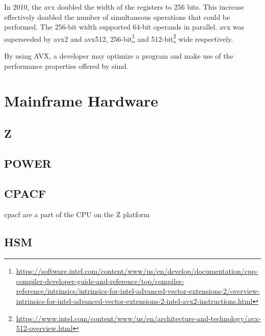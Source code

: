 In 2010, the \gls{avx} doubled the width of the registers to 256 bits. This increase effectively doubled the number of simultaneous operations that could be performed. The 256-bit width supported 64-bit operands in parallel\cite{hennessy2011:avx}. \gls{avx} was superseeded by \gls{avx2} and \gls{avx512}, 256-bit\footnote{\href{https://software.intel.com/content/www/us/en/develop/documentation/cpp-compiler-developer-guide-and-reference/top/compiler-reference/intrinsics/intrinsics-for-intel-advanced-vector-extensions-2/overview-intrinsics-for-intel-advanced-vector-extensions-2-intel-avx2-instructions.html}{https://software.intel.com/content/www/us/en/develop/documentation/cpp-compiler-developer-guide-and-reference/top/compiler-reference/intrinsics/intrinsics-for-intel-advanced-vector-extensions-2/overview-intrinsics-for-intel-advanced-vector-extensions-2-intel-avx2-instructions.html}} and 512-bit\footnote{\href{https://www.intel.com/content/www/us/en/architecture-and-technology/avx-512-overview.html}{https://www.intel.com/content/www/us/en/architecture-and-technology/avx-512-overview.html}} wide respectively.

By using AVX, a developer may optimize a program and make use of the performance properties offered by \gls{simd}\cite{hennessy2011:avx}.

\section{Mainframe Hardware}


\subsection{Z}

\subsection{POWER}

\subsection{CPACF}
\gls{cpacf} are a part of the CPU on the Z platform

\subsection{HSM}
